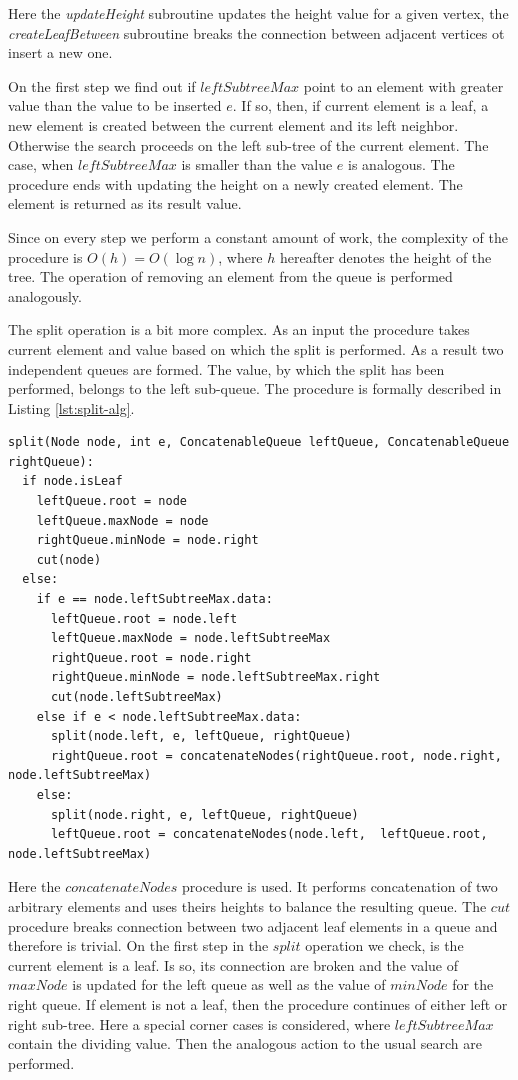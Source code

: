 \documentclass[twoside,twocolumn,10pt]{article}
\begin{document}
	Here the \textit{updateHeight} subroutine updates the height value for a given vertex, the \textit{createLeafBetween} subroutine breaks the connection between adjacent vertices ot insert a new one.
	
	On the first step we find out if $leftSubtreeMax$ point to an element with greater value than the value to be inserted $e$. If so, then, if current element is a leaf, a new element is created between the current element and its left neighbor. Otherwise the search proceeds on the left sub-tree of the current element. The case, when $leftSubtreeMax$ is smaller than the value $e$ is analogous. The procedure ends with updating the height on a newly created element. The element is returned as its result value.
	
	Since on every step we perform a constant amount of work, the complexity of the procedure is $O(h)=O(\log n)$, where $h$ hereafter denotes the height of the tree. The operation of removing an element from the queue is performed analogously. 
	
	The split operation is a bit more complex. As an input the procedure takes current element and value based on which the split is performed. As a result two independent queues are formed. The value, by which the split has been performed, belongs to the left sub-queue. The procedure is formally described in Listing \ref{lst:split-alg}.
	
		\begin{lstlisting}[caption={Queue split algorithm},label={lst:split-alg},captionpos=b]
split(Node node, int e, ConcatenableQueue leftQueue, ConcatenableQueue rightQueue):
  if node.isLeaf
    leftQueue.root = node
    leftQueue.maxNode = node
    rightQueue.minNode = node.right
    cut(node)
  else:
    if e == node.leftSubtreeMax.data:
      leftQueue.root = node.left
      leftQueue.maxNode = node.leftSubtreeMax
      rightQueue.root = node.right
      rightQueue.minNode = node.leftSubtreeMax.right
      cut(node.leftSubtreeMax)
    else if e < node.leftSubtreeMax.data:
      split(node.left, e, leftQueue, rightQueue)
      rightQueue.root = concatenateNodes(rightQueue.root, node.right, node.leftSubtreeMax)
    else:
      split(node.right, e, leftQueue, rightQueue)
      leftQueue.root = concatenateNodes(node.left,  leftQueue.root, node.leftSubtreeMax)
		\end{lstlisting}

	Here the $concatenateNodes$ procedure is used. It performs concatenation of two arbitrary elements and uses theirs heights to balance the resulting queue. The $cut$ procedure breaks connection between two adjacent leaf elements in a queue and therefore is trivial. On the first step in the $split$ operation we check, is the current element is a leaf. Is so, its connection are broken and the value of $maxNode$ is updated for the left queue as well as the value of $minNode$ for the right queue. If element is not a leaf, then the procedure continues of either left or right sub-tree. Here a special corner cases is considered, where $leftSubtreeMax$ contain the dividing value. Then the analogous action to the usual search are performed.
	
\end{document}
